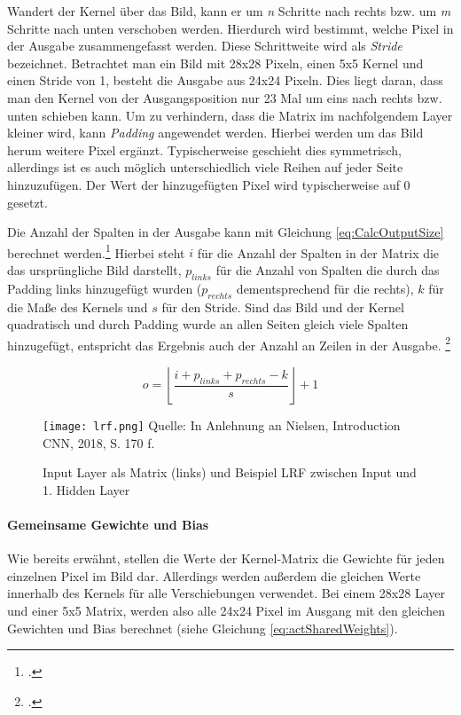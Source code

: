 Wandert der Kernel über das Bild, kann er um \textit{n} Schritte nach rechts bzw. um \textit{m} Schritte nach unten verschoben werden. Hierdurch wird bestimmt, welche Pixel in der Ausgabe zusammengefasst werden. Diese Schrittweite wird als \textit{Stride} bezeichnet. Betrachtet man ein Bild mit 28x28 Pixeln, einen 5x5 Kernel und einen Stride von 1, besteht die Ausgabe aus 24x24 Pixeln. Dies liegt daran, dass man den Kernel von der Ausgangsposition nur 23 Mal um eins nach rechts bzw. unten schieben kann. Um zu verhindern, dass die Matrix im nachfolgendem Layer kleiner wird, kann \textit{Padding} angewendet werden. Hierbei werden um das Bild herum weitere Pixel ergänzt. Typischerweise geschieht dies symmetrisch, allerdings ist es auch möglich unterschiedlich viele Reihen auf jeder Seite hinzuzufügen. Der Wert der hinzugefügten Pixel wird typischerweise auf $0$ gesetzt.

Die Anzahl der Spalten in der Ausgabe kann mit Gleichung \ref{eq:CalcOutputSize} berechnet werden.\footcite[Vgl.][S. 15]{dumoulinGuideConvolutionArithmetic2018} Hierbei steht $i$ für die Anzahl der Spalten in der Matrix die das ursprüngliche Bild darstellt, $p_{links}$ für die Anzahl von Spalten die durch das Padding links hinzugefügt wurden ($p_{rechts}$ dementsprechend für die rechts), $k$ für die Maße des Kernels und $s$ für den Stride. Sind das Bild und der Kernel quadratisch und durch Padding wurde an allen Seiten gleich viele Spalten hinzugefügt, entspricht das Ergebnis auch der Anzahl an Zeilen in der Ausgabe. \footcite[Vgl.][S. 169-171]{nielsenNeuralNetworksDeep2015}

\begin{equation} \label{eq:CalcOutputSize}
    o=\left\lfloor\frac{i+p_{links}+p_{rechts}-k}{s}\right\rfloor+1
\end{equation}


\begin{figure}[t]
    \centering
    \caption[]{Input Layer als Matrix (links) und Beispiel \ac{LRF} zwischen Input und 1. Hidden Layer}
	\label{fig:lrf}
    \texttt{[image: lrf.png]}
    Quelle: In Anlehnung an Nielsen, Introduction CNN, 2018, S. 170 f.
\end{figure}

\paragraph{Gemeinsame Gewichte und Bias}
Wie bereits erwähnt, stellen die Werte der Kernel-Matrix die Gewichte für jeden einzelnen Pixel im Bild dar. Allerdings werden außerdem die gleichen Werte innerhalb des Kernels für alle Verschiebungen verwendet. Bei einem 28x28 Layer und einer 5x5 Matrix, werden also alle 24x24 Pixel im Ausgang mit den gleichen Gewichten und Bias berechnet (siehe Gleichung \ref{eq:actSharedWeights}).

